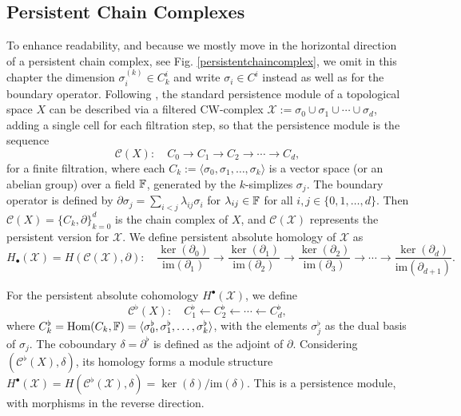 \subsection{Persistent Chain Complexes}
To enhance readability, and because we mostly move in the horizontal direction of a persistent chain complex, see Fig. \ref{persistentchaincomplex}, we omit in this chapter the dimension $\sigma^{(k)}_i \in C^i_k$ and write $\sigma_i \in C^i$ instead as well as for the boundary operator. Following \cite[\S 2.6]{de2011dualities}, the standard persistence module of a topological space $X$ can be described via a filtered CW-complex $\mathcal{X}:= \sigma_0 \cup \sigma_1 \cup \cdots \cup \sigma_d$, adding a single cell for each filtration step, so that the persistence module is the sequence
\[
	\mathcal{C}(X): \quad C_{0} \to C_{1} \to C_{2} \to \cdots \to C_{d},
\]
for a finite filtration, where each $C_{k} := \langle \sigma_0, \sigma_1, \ldots, \sigma_k \rangle$ is a vector space (or an abelian group) over a field ${\mathbb{F}}$, generated by the $k$-simplizes $\sigma_j$. The boundary operator is defined by $\partial \sigma_{j} = \sum_{i<j}\lambda_{ij}\sigma_{i}$ for $\lambda_{ij}\in {\mathbb{F}}$ for all $i, j \in \{0, 1, \ldots, d\}$. Then $\mathcal{C}(X) = \{C_{k},\partial\}_{k=0}^{d}$ is the chain complex of $X$, and $\mathcal{C}(\mathcal{X})$ represents the persistent version for $\mathcal{X}$. We define persistent absolute homology of $\mathcal{X}$ as
\[
	H_{\bullet}(\mathcal{X}) = H(\mathcal{C}(\mathcal{X}), \partial): \quad \frac{\ker(\partial_{0})}{\text{im}(\partial_{1})}
	\to \frac{\ker(\partial_{1})}{\text{im}(\partial_{2})} \to \frac{\ker(\partial_{2})}{\text{im}(\partial_{3})}\to \cdots \to \frac{\ker(\partial_{d})}{\text{im}(\partial_{d+1})}
	.
\]

For the persistent absolute cohomology $H^{\bullet}(\mathcal{X})$, we define
\[
	\label{cohomcomplex}
	\mathcal{C}^{\flat}(X): \quad C^{\flat}_{1} \leftarrow C^{\flat}_{2} \leftarrow \cdots
	\leftarrow C^{\flat}_{d},
\]
where $C^{\flat}_k = \text{Hom}(C_k, {\mathbb{F}}) = \langle \sigma_0^{\flat}, \sigma_1^{\flat}, \ldots, \sigma_k^{\flat} \rangle$, with the elements $\sigma^{\flat}_j$ as the dual basis of $\sigma_j$. The coboundary $\delta= \partial^{\flat}$ is defined as the adjoint of $\partial$. Considering $(\mathcal{C}^{\flat}(X), \delta)$, its homology forms a module structure $H^{\bullet}(\mathcal{X}) = H(\mathcal{C}^{\flat}(\mathcal{X}), \delta) = \ker(\delta) / \text{im}(\delta)$. This is a persistence module, with morphisms in the reverse direction.

